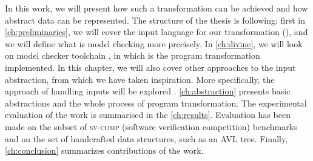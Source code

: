In this work, we will present how such a transformation can be achieved and how
abstract data can be represented. The structure of the thesis is following:
first in \autoref{ch:preliminaries}, we will cover the input language for our
transformation (\LLVM), and we will define what is model checking more
precisely. In \autoref{ch:divine}, we will look on \DIVINE model checker
toolchain \cite{Divine17}, in which is the program transformation implemented.
In this chapter, we will also cover other approaches to the input abstraction,
from which we have taken inspiration. More specifically, the \SymDIVINE
approach of handling inputs will be explored \cite{Mrazek16}.
\autoref{ch:abstraction} presents basic abstractions and the whole process of
program transformation. The experimental evaluation of the work is summarised
in the \autoref{ch:results}. Evaluation has been made on the subset of
\textsc{sv-comp} (software verification competition) benchmarks
\cite{Beyer17} and on the set of handcrafted data structures, such as an AVL
tree. Finally, \autoref{ch:conclusion} summarizes contributions of the work.

